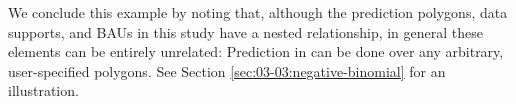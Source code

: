 \documentclass[nojss]{jss}
\begin{document}
 
 We conclude this example by noting that, although the prediction polygons, data supports, and BAUs in this study have a nested relationship, in general these elements can be entirely unrelated: Prediction in  can be done over any arbitrary, user-specified polygons. See Section \ref{sec:03-03:negative-binomial} for an illustration. 
 
\end{document}
